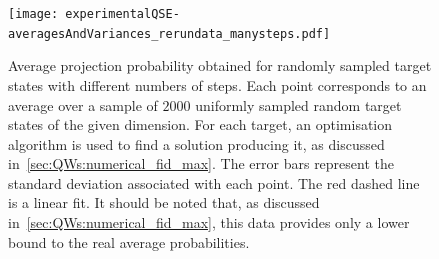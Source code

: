 \begin{figure}[tb]
    \centering
    \texttt{[image: experimentalQSE-averagesAndVariances\_rerundata\_manysteps.pdf]}
    \caption{
    	Average projection probability obtained for randomly sampled target states with different numbers of steps. Each point corresponds to an average over a sample of $2000$ uniformly sampled random target states of the given dimension. For each target, an optimisation algorithm is used to find a solution producing it, as discussed in~\cref{sec:QWs:numerical_fid_max}. The error bars represent the standard deviation associated with each point. The red dashed line is a linear fit. It should be noted that, as discussed in~\cref{sec:QWs:numerical_fid_max}, this data provides only a lower bound to the real average probabilities.%
    }
    \label{fig:expQWs:avgProbabilitiesVsStepNumber}
\end{figure}


